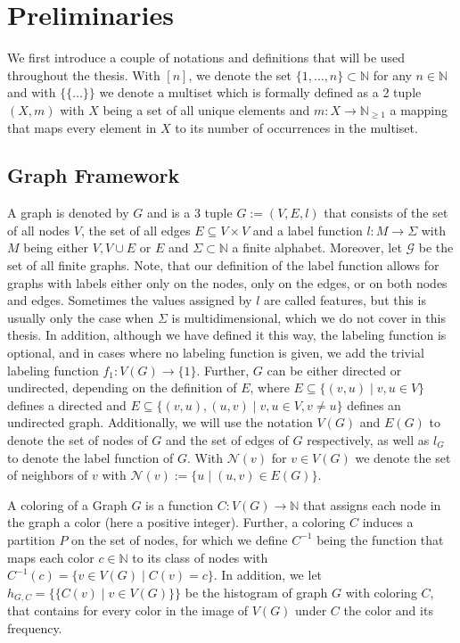 \documentclass[11pt, dvipsnames, DIV=12]{scrreprt}
\theoremstyle{definition}
\newcommand{\MSopen}{\{\!\!\{}
\newcommand{\MSclose}{\}\!\!\}}
\begin{document}
\section{Preliminaries}
We first introduce a couple of notations and definitions that will be used throughout the thesis. With $[n]$, we denote the set $\{1, \ldots, n\} \subset \mathbb{N}$ for any $n \in \mathbb{N}$ and with $\MSopen \ldots \MSclose$ we denote a multiset which is formally defined as a 2 tuple $(X, m)$ with $X$ being a set of all unique elements and $m: X \rightarrow \mathbb{N}_{\geq 1}$ a mapping that maps every element in $X$ to its number of occurrences in the multiset.

\subsection{Graph Framework}
A graph is denoted by $G$ and is a 3 tuple $G:= (V, E, l)$ that consists of the set of all nodes $V$, the set of all edges $E \subseteq V \times V$ and a label function $l: M \rightarrow \Sigma$ with $M$ being either $V, V \cup E$ or $E$ and $\Sigma \subset \mathbb{N}$ a finite alphabet. Moreover, let $\mathcal{G}$ be the set of all finite graphs. Note, that our definition of the label function allows for graphs with labels either only on the nodes, only on the edges, or on both nodes and edges. Sometimes the values assigned by $l$ are called features, but this is usually only the case when $\Sigma$ is multidimensional, which we do not cover in this thesis. In addition, although we have defined it this way, the labeling function is optional, and in cases where no labeling function is given, we add the trivial labeling function $f_1: V(G) \rightarrow \{1\}$. Further, $G$ can be either directed or undirected, depending on the definition of $E$, where $E \subseteq \{(v,u) \mid v,u \in V\}$ defines a directed and $E \subseteq \{(v, u), (u,v) \mid v,u \in V, v\neq u\}$ defines an undirected graph. Additionally, we will use the notation $V(G)$ and $E(G)$ to denote the set of nodes of $G$ and the set of edges of $G$ respectively, as well as $l_G$ to denote the label function of $G$. With $\mathcal{N}(v)$ for $v \in V(G)$ we denote the set of neighbors of $v$ with $\mathcal{N}(v) := \{u \mid (u, v) \in E(G)\}$.

A coloring of a Graph $G$ is a function $C: V(G) \rightarrow \mathbb{N}$ that assigns each node in the graph a color (here a positive integer). Further, a coloring $C$ induces a partition $P$ on the set of nodes, for which we define $C^{-1}$ being the function that maps each color $c \in \mathbb{N}$ to its class of nodes with $C^{-1}(c) = \{ v\in V(G) \mid C(v) = c\}$. In addition, we let $h_{G, C} = \MSopen C(v) \mid v \in V(G) \MSclose$ be the histogram of graph $G$ with coloring $C$, that contains for every color in the image of $V(G)$ under $C$ the color and its frequency.
\end{document}
